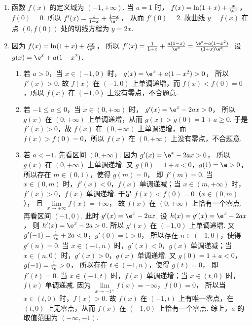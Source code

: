\begin{solution}
\begin{enumerate}
\item 函数 \(f(x)\) 的定义域为 \((-1,+\infty)\).
当 \(a=1\) 时，
\(f(x)=\ln(1+x)+\frac{x}{\e^x}\)，\(f(0)=0\).
所以
\(f'(x)=\frac{1}{1+x}+\frac{1-x}{\e^x}\)，
从而
\(f'(0)=2\).
故曲线 \(y=f(x)\) 在点 \(\left( 0,f(0) \right)\) 处的切线方程为
\(y=2x\).

\item 因为
\(f(x)=\ln(1+x)+\frac{ax}{\e^x}\)，
所以
\(f'(x)=\frac{1}{1+x}+\frac{a(1-x)}{\e^x} =\frac{\e^x+a(1-x^2)}{(1+x)\e^x}\).
设
\(g(x)=\e^x+a(1-x^2)\).
\begin{enumerate}
\item 若 \(a>0\)，当 \(x\in(-1,0)\) 时，
\(g(x)=\e^x+a(1-x^2)>0\)，
所以 \(f'(x)>0\).
故 \(f(x)\) 在 \((-1,0)\) 上单调递增，而 \(f(x)<f(0)=0\)，所以 \(f(x)\) 在 \((-1,0)\) 上没有零点，不合题意.

\item 若 \(-1\le a\le 0\)，当 \(x\in(0,+\infty)\) 时，
\(g'(x)=\e^x-2ax>0\)，
所以 \(g(x)\) 在 \((0,+\infty)\) 上单调递增，从而
\(g(x)>g(0)=1+a\ge 0\).
于是 \(f'(x)>0\)，故 \(f(x)\) 在 \((0,+\infty)\) 上单调递增，而 \(f(x)>f(0)=0\)，所以 \(f(x)\) 在 \((0,+\infty)\) 上没有零点，不合题意.

\item 若 \(a<-1\).
先看区间 \((0,+\infty)\). 因为
\(g'(x)=\e^x-2ax>0\)，
所以 \(g(x)\) 在 \((0,+\infty)\) 上单调递增.
又
\(g(0)=1+a<0\)，\(g(1)=\e>0\)，
所以存在 \(m\in(0,1)\)，使得
\(g(m)=0\)，
即 \(f'(m)=0\).
当 \(x\in(0,m)\) 时，\(f'(x)<0\)，\(f(x)\) 单调递减；当 \(x\in(m,+\infty)\) 时，\(f'(x)>0\)，\(f(x)\) 单调递增.
于是
\(f(x)<f(0)=0\)（\(x\in(0,m)\)），
且
\(\lim\limits_{x\to+\infty}f(x)=+\infty\)，
故 \(f(x)\) 在 \((0,+\infty)\) 上恰有一个零点.
再看区间 \((-1,0)\). 此时
\(g'(x)=\e^x-2ax\).
设
\(h(x)=g'(x)=\e^x-2ax\)，
则
\(h'(x)=\e^x-2a>0\).
所以 \(g'(x)\) 在 \((-1,0)\) 上单调递增.
又
\(g'(-1)=\frac{1}{\e}+2a<0\)，\(g'(0)=1>0\)，
所以存在 \(n\in(-1,0)\)，使得
\(g'(n)=0\).
当 \(x\in(-1,n)\) 时，\(g'(x)<0\)，\(g(x)\) 单调递减；当 \(x\in(n,0)\) 时，\(g'(x)>0\)，\(g(x)\) 单调递增.
又
\(g(0)=1+a<0\)，\(g(-1)=\frac{1}{\e}>0\)，
所以存在 \(t\in(-1,n)\)，使得
\(g(t)=0\)，
即 \(f'(t)=0\).
当 \(x\in(-1,t)\) 时，\(f(x)\) 单调递增；当 \(x\in(t,0)\) 时，\(f(x)\) 单调递减.
因为
\(\lim\limits_{x\to-1^+}f(x)=-\infty\)，\(f(0)=0\)，
所以当 \(x\in(t,0)\) 时，\(f(x)>0\).
故 \(f(x)\) 在 \((-1,t)\) 上有唯一零点，在 \((t,0)\) 上无零点，从而 \(f(x)\) 在 \((-1,0)\) 上恰有一个零点.
综上，\(a\) 的取值范围为
\((-\infty,-1)\).
\end{enumerate}
\end{enumerate}
\end{solution}

